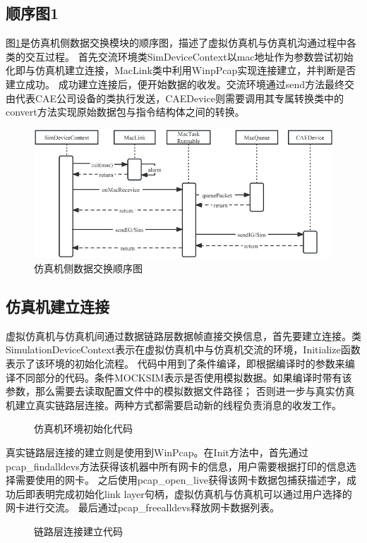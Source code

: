 \subsection{顺序图1}
图\ref{seq1}是仿真机侧数据交换模块的顺序图，描述了虚拟仿真机与仿真机沟通过程中各类的交互过程。
首先交流环境类SimDeviceContext以mac地址作为参数尝试初始化即与仿真机建立连接，MacLink类中利用WinpPcap实现连接建立，并判断是否建立成功。
成功建立连接后，便开始数据的收发。交流环境通过send方法最终交由代表CAE公司设备的类执行发送，CAEDevice则需要调用其专属转换类中的convert方法实现原始数据包与指令结构体之间的转换。
\begin{figure}[h!]

    \begin{center}
        \includegraphics[width=\textwidth]{pictures/sequence1.pdf}
        \caption{仿真机侧数据交换顺序图}
        \label{seq1}
    \end{center}
\end{figure}
\subsection{仿真机建立连接}
虚拟仿真机与仿真机间通过数据链路层数据帧直接交换信息，首先要建立连接。类SimulationDeviceContext表示在虚拟仿真机中与仿真机交流的环境，Initialize函数表示了该环境的初始化流程。
代码中用到了条件编译，即根据编译时的参数来编译不同部分的代码。条件MOCKSIM表示是否使用模拟数据。如果编译时带有该参数，那么需要去读取配置文件中的模拟数据文件路径；
否则进一步与真实仿真机建立真实链路层连接。两种方式都需要启动新的线程负责消息的收发工作。
\begin{figure}[h!]
    \centering
     
    \caption{仿真机环境初始化代码}
    \label{code1}
\end{figure}

\par
真实链路层连接的建立则是使用到WinPcap。在Init方法中，首先通过pcap\_findalldevs方法获得该机器中所有网卡的信息，用户需要根据打印的信息选择需要使用的网卡。
之后使用pcap\_open\_live获得该网卡数据包捕获描述字，成功后即表明完成初始化link layer句柄，虚拟仿真机与仿真机可以通过用户选择的网卡进行交流。
最后通过pcap\_freealldevs释放网卡数据列表。
\clearpage
\begin{figure}[h!]
    \centering
     
    \caption{链路层连接建立代码}
    \label{code2}
\end{figure}

